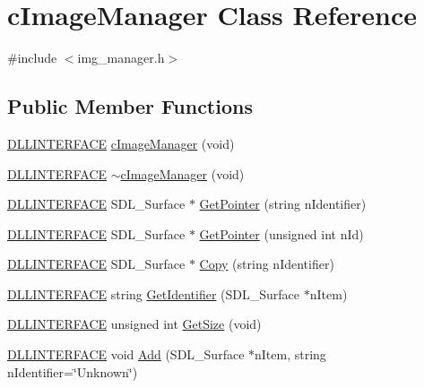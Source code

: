 \hypertarget{classc_image_manager}{\section{c\-Image\-Manager Class Reference}
\label{classc_image_manager}
}


{\ttfamily \#include $<$img\-\_\-manager.\-h$>$}

\subsection*{Public Member Functions}
\begin{DoxyCompactItemize}
\item 
\hyperlink{_s_d_l__ep_8h_a38dd54df4631b4daf553096353d7b20b}{D\-L\-L\-I\-N\-T\-E\-R\-F\-A\-C\-E} \hyperlink{classc_image_manager_aae92671be321555807943f8767237502}{c\-Image\-Manager} (void)
\item 
\hyperlink{_s_d_l__ep_8h_a38dd54df4631b4daf553096353d7b20b}{D\-L\-L\-I\-N\-T\-E\-R\-F\-A\-C\-E} \hyperlink{classc_image_manager_aa2ef12dd389d211dba766e6ce98bbc11}{$\sim$c\-Image\-Manager} (void)
\item 
\hyperlink{_s_d_l__ep_8h_a38dd54df4631b4daf553096353d7b20b}{D\-L\-L\-I\-N\-T\-E\-R\-F\-A\-C\-E} S\-D\-L\-\_\-\-Surface $\ast$ \hyperlink{classc_image_manager_a5638983fe636bd42812ded2c62bf6a7f}{Get\-Pointer} (string n\-Identifier)
\item 
\hyperlink{_s_d_l__ep_8h_a38dd54df4631b4daf553096353d7b20b}{D\-L\-L\-I\-N\-T\-E\-R\-F\-A\-C\-E} S\-D\-L\-\_\-\-Surface $\ast$ \hyperlink{classc_image_manager_afe47c673161499f814839c28c382728a}{Get\-Pointer} (unsigned int n\-Id)
\item 
\hyperlink{_s_d_l__ep_8h_a38dd54df4631b4daf553096353d7b20b}{D\-L\-L\-I\-N\-T\-E\-R\-F\-A\-C\-E} S\-D\-L\-\_\-\-Surface $\ast$ \hyperlink{classc_image_manager_ae15aee0c24a46f20049f3e27850a7abf}{Copy} (string n\-Identifier)
\item 
\hyperlink{_s_d_l__ep_8h_a38dd54df4631b4daf553096353d7b20b}{D\-L\-L\-I\-N\-T\-E\-R\-F\-A\-C\-E} string \hyperlink{classc_image_manager_ae5fbcb0a2b3e289bc1f5afc415d2918b}{Get\-Identifier} (S\-D\-L\-\_\-\-Surface $\ast$n\-Item)
\item 
\hyperlink{_s_d_l__ep_8h_a38dd54df4631b4daf553096353d7b20b}{D\-L\-L\-I\-N\-T\-E\-R\-F\-A\-C\-E} unsigned int \hyperlink{classc_image_manager_a5baa31ec219d6ebd9ba4fa9f7170d154}{Get\-Size} (void)
\item 
\hyperlink{_s_d_l__ep_8h_a38dd54df4631b4daf553096353d7b20b}{D\-L\-L\-I\-N\-T\-E\-R\-F\-A\-C\-E} void \hyperlink{classc_image_manager_afa074f584b764260cc0f3adcec8c8843}{Add} (S\-D\-L\-\_\-\-Surface $\ast$n\-Item, string n\-Identifier=\char`\"{}Unknown\char`\"{})

\end{DoxyCompactItemize}

